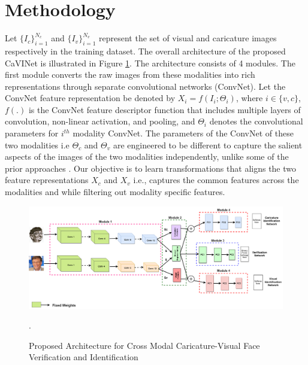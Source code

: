 

\section{Methodology}
Let $\{I_{c}\}_{i=1}^{N_c}$ and $\{I_{v}\}_{i=1}^{N_v}$ represent the set of visual and caricature images respectively in the training dataset. The overall architecture of the proposed CaVINet is illustrated in Figure \ref{fig:architecture}. The architecture consists of 4 modules. The first module converts the raw  images from these modalities into rich representations through separate convolutional networks (ConvNet). Let the ConvNet feature representation be denoted by ${ X }_{ i }= f\left( { I }_{ i }; { \Theta }_{ i } \right) $, where $i\in \{ { v },{ c }\} $, $f(.)$ is the ConvNet feature descriptor function that includes multiple layers of convolution, non-linear activation, and pooling, and $\Theta_{i}$ denotes the convolutional parameters for $i^{th}$ modality ConvNet. The parameters of the ConvNet of these two modalities i.e $\Theta_{c}$ and $\Theta_{v}$ are engineered to be different to capture the salient aspects of the images of the two modalities independently, unlike some of the prior approaches \cite{AAAI_2017}. Our objective is to learn transformations that aligns the two feature representations $X_c$ and $X_v$ i.e., captures the common features across the modalities and while filtering out modality specific features.

\begin{figure}[h]
\centering
\includegraphics[width=\textwidth]{images/final_complete_archi.png}
\caption{
Proposed Architecture for Cross Modal Caricature-Visual Face Verification and Identification}.
\label{fig:architecture} 
\end{figure}

